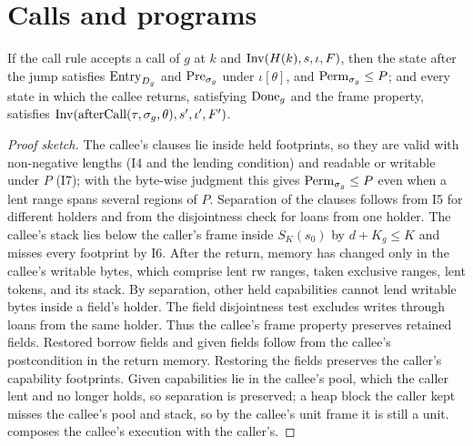 \section{Calls and programs}\label{sec:compose}
\begin{lem}\label{lem:call}
If the call rule accepts a call of $g$ at $k$ and $\mathrm{Inv}(H(k),s,\iota,F)$, then the state after the jump satisfies $\mathrm{Entry}_{D_g}$ and $\mathrm{Pre}_{\sigma_g}$ under $\iota[\theta]$, and $\mathrm{Perm}_{\sigma_g}\le P$; and every state in which the callee returns, satisfying $\mathrm{Done}_g$ and the frame property, satisfies $\mathrm{Inv}(\mathrm{afterCall}(\tau,\sigma_g,\theta),s',\iota',F')$.
\end{lem}
\begin{proof}[Proof sketch]
The callee's clauses lie inside held footprints, so they are valid with non-negative lengths (I4 and the lending condition) and readable or writable under $P$ (I7); with the byte-wise judgment this gives $\mathrm{Perm}_{\sigma_g}\le P$ even when a lent range spans several regions of $P$. Separation of the clauses follows from I5 for different holders and from the disjointness check for loans from one holder. The callee's stack lies below the caller's frame inside $S_K(s_0)$ by $d+K_g\le K$ and misses every footprint by I6. After the return, memory has changed only in the callee's writable bytes, which comprise lent \textsf{rw} ranges, taken exclusive ranges, lent tokens, and its stack. By separation, other held capabilities cannot lend writable bytes inside a field's holder. The field disjointness test excludes writes through loans from the same holder. Thus the callee's frame property preserves retained fields. Restored borrow fields and given fields follow from the callee's postcondition in the return memory. Restoring the fields preserves the caller's capability footprints. Given capabilities lie in the callee's pool, which the caller lent and no longer holds, so separation is preserved; a \textsf{heap} block the caller kept misses the callee's pool and stack, so by the callee's unit frame it is still a unit.  composes the callee's execution with the caller's.
\end{proof}

